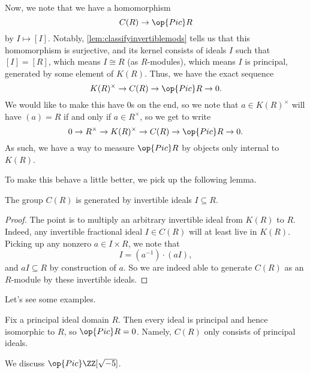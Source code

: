 \documentclass[../notes.tex]{subfiles}
\begin{document}
Now, we note that we have a homomorphism
\[C(R)\to\op{Pic}R\]
by $I\mapsto[I]$. Notably, \autoref{lem:classifyinvertiblemods} tells us that this homomorphism is surjective, and its kernel consists of ideals $I$ such that $[I]=[R]$, which means $I\cong R$ (as $R$-modules), which means $I$ is principal, generated by some element of $K(R)$. Thus, we have the exact sequence
\[K(R)^\times\to C(R)\to\op{Pic}R\to0.\]
We would like to make this have $0$s on the end, so we note that $a\in K(R)^\times$ will have $(a)=R$ if and only if $a\in R^\times$, so we get to write
\[0\to R^\times\to K(R)^\times\to C(R)\to\op{Pic}R\to0.\]
As such, we have a way to measure $\op{Pic}R$ by objects only internal to $K(R)$.

To make this behave a little better, we pick up the following lemma.
\begin{lemma}
	The group $C(R)$ is generated by invertible ideals $I\subseteq R$.
\end{lemma}
\begin{proof}
	The point is to multiply an arbitrary invertible ideal from $K(R)$ to $R$. Indeed, any invertible fractional ideal $I\in C(R)$ will at least live in $K(R)$. Picking up any nonzero $a\in I\times R$, we note that
	\[I=\left(a^{-1}\right)\cdot(aI),\]
	and $aI\subseteq R$ by construction of $a$. So we are indeed able to generate $C(R)$ as an $R$-module by these invertible ideals.
\end{proof}
Let's see some examples.
\begin{example}
	Fix a principal ideal domain $R$. Then every ideal is principal and hence isomorphic to $R$, so $\op{Pic}R=0$. Namely, $C(R)$ only consists of principal ideals.
\end{example}
\begin{exe}
	We discuss $\op{Pic}\ZZ[\sqrt{-5}]$.
\end{exe}
\end{document}
